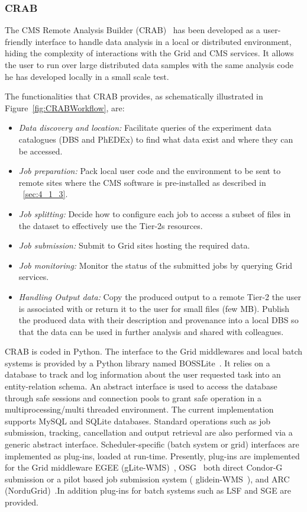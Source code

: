 %
\label{sec:3_2}
\subsubsection{CRAB}
\label{sec:CRAB}
The CMS Remote Analysis Builder (CRAB)~\cite{RefCRAB} has been developed as a user-friendly interface to handle data analysis in a local or distributed environment, hiding the complexity of interactions with the Grid and CMS services.
It allows the user to run over large distributed data samples with the same analysis code he has developed 
locally in a small scale test. 

The functionalities that CRAB provides, as schematically illustrated in Figure~\ref{fig:CRABWorkflow}, are:
\begin{itemize}
\item{\it{Data discovery and location:}}
Facilitate queries of the experiment data catalogues (DBS and PhEDEx) to find 
what data exist and where they can be accessed.
\item{\it{Job preparation:}}
Pack local user code and the environment to be sent to remote sites where the CMS software is pre-installed as described in ~\ref{sec:4_1_3}.
\item{\it{Job splitting:}}
Decide how to configure each job to access a subset of files in the dataset to effectively use the Tier-2s resources.
\item{\it{Job submission:}}
Submit to Grid sites hosting the required data.
\item{\it{Job monitoring:}}
Monitor the status of the submitted jobs by querying Grid services.
\item{\it{Handling Output data:}}
Copy the produced output to a remote Tier-2 the user is associated with or return it to the user for small files (few MB).
Publish the produced data with their description and provenance into a local DBS so that the data can be used in further analysis and shared with colleagues.
\end{itemize} 

CRAB is coded in Python. The interface to the Grid middlewares and local batch systems is provided by a Python library named BOSSLite~\cite{RefBOSSLite}. It relies on a database to track and log information about the user requested task into an entity-relation schema.
An abstract interface is used to access the database through safe sessions and connection pools to grant safe operation in a multiprocessing/multi threaded environment. The current implementation supports MySQL and SQLite databases.
Standard operations such as job submission, tracking, cancellation and output retrieval are also performed via a generic abstract interface. Scheduler-specific (batch system or grid) interfaces are implemented as plug-ins, loaded at run-time. Presently, plug-ins are implemented for the Grid middleware EGEE (gLite-WMS)~\cite{RefgLiteWMS}, OSG~\cite{RefOSG} both direct Condor-G submission or a pilot based job submission system ( glidein-WMS~\cite{Refglidein}), and ARC (NorduGrid)~\cite{RefARC}.In addition plug-ins for batch systems such as LSF and SGE are provided.

